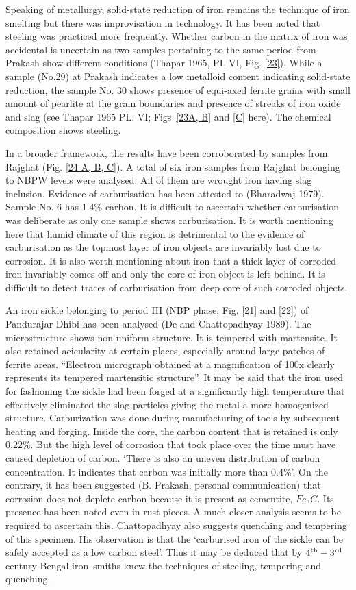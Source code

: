 Speaking of metallurgy, solid-state reduction of iron remains the technique of iron smelting but there was improvisation in technology. It has been noted that steeling was practiced more frequently. Whether carbon in the matrix of iron was accidental is uncertain as two samples pertaining to the same period from Prakash show different conditions (Thapar 1965, PL VI, Fig. \ref{23}). While a sample (No.29) at Prakash indicates a low metalloid content indicating solid-state reduction, the sample No. 30 shows presence of equi-axed ferrite grains with small amount of pearlite at the grain boundaries and presence of streaks of iron oxide and slag (see Thapar 1965 PL. VI; Figs~\ref{23A, B} and \ref{C} here). The chemical composition shows steeling.

In a broader framework, the results have been corroborated by samples from Rajghat (Fig. \ref{24 A, B, C}). A total of six iron samples from Rajghat belonging to NBPW levels were analysed. All of them are wrought iron having slag inclusion. Evidence of carburisation has been attested to (Bharadwaj 1979). Sample No. 6 has 1.4\% carbon. It is difficult to ascertain whether carburisation was deliberate as only one sample shows carburisation. It is worth mentioning here that humid climate of this region is detrimental to the evidence of carburisation as the topmost layer of iron objects are invariably lost due to corrosion. It is also worth mentioning about iron that a thick layer of corroded iron invariably comes off and only the core of iron object is left behind. It is difficult to detect traces of carburisation from deep core of such corroded objects.

An iron sickle belonging to period III (NBP phase, Fig. \ref{21} and \ref{22}) of Pandurajar Dhibi has been analysed (De and Chattopadhyay 1989). The microstructure shows non-uniform structure. It is tempered with martensite. It also retained acicularity at certain places, especially around large patches of ferrite areas. “Electron micrograph obtained at a magnification of 100x clearly represents its tempered martensitic structure”. It may be said that the iron used for fashioning the sickle had been forged at a significantly high temperature that effectively eliminated the slag particles giving the metal a more homogenized structure. Carburization was done during manufacturing of tools by subsequent heating and forging. Inside the core, the carbon content that is retained is only 0.22\%. But the high level of corrosion that took place over the time must have caused depletion of carbon. ‘There is also an uneven distribution of carbon concentration. It indicates that carbon was initially more than 0.4\%’. On the contrary, it has been suggested (B. Prakash, personal communication) that corrosion does not deplete carbon because it is present as cementite, $Fe_3C$. Its presence has been noted even in rust pieces. A much closer analysis seems to be required to ascertain this. Chattopadhyay also suggests quenching and tempering of this specimen. His observation is that the ‘carburised iron of the sickle can be safely accepted as a low carbon steel’. Thus it may be deduced that by $4^{\rm th}-3^{\rm rd}$ century Bengal iron–smiths knew the techniques of steeling, tempering and quenching.

